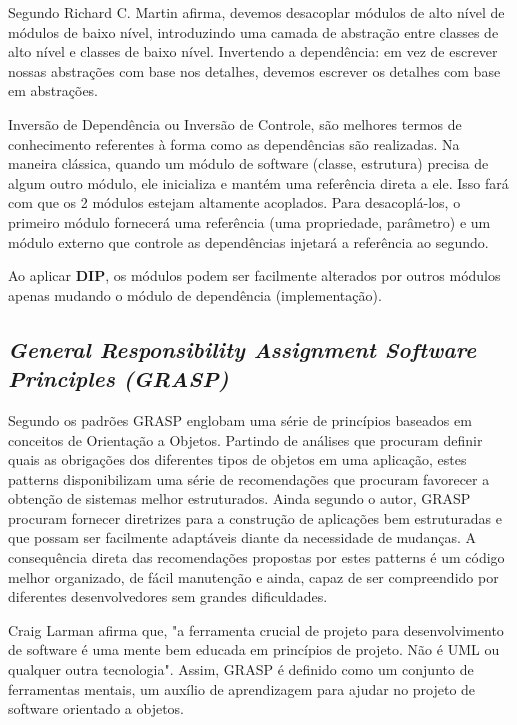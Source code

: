 \documentclass[12pt]{article}
\begin{document}
Segundo Richard C. Martin \cite{ROBERT_MARTIN_THE_CLEAN_ARCHITECTURE} afirma, devemos desacoplar módulos de alto nível de módulos de baixo nível, introduzindo uma camada de abstração entre classes de alto nível e classes de baixo nível. Invertendo a dependência: em vez de escrever nossas abstrações com base nos detalhes, devemos escrever os detalhes com base em abstrações.

Inversão de Dependência ou Inversão de Controle, são melhores termos de conhecimento referentes à forma como as dependências são realizadas. Na maneira clássica, quando um módulo de software (classe, estrutura) precisa de algum outro módulo, ele inicializa e mantém uma referência direta a ele. Isso fará com que os 2 módulos estejam altamente acoplados. Para desacoplá-los, o primeiro módulo fornecerá uma referência (uma propriedade, parâmetro) e um módulo externo que controle as dependências injetará a referência ao segundo.

Ao aplicar \textbf{DIP}, os módulos podem ser facilmente alterados por outros módulos apenas mudando o módulo de dependência (implementação).

\subsection{\textit{General Responsibility Assignment Software Principles (GRASP)}} \label{sec:grasp}

Segundo \cite{CRAIG_LARMAN} os padrões GRASP englobam uma série de princípios baseados em conceitos de Orientação a Objetos. Partindo de análises que procuram definir quais as obrigações dos diferentes tipos de objetos em uma aplicação, estes patterns disponibilizam uma série de recomendações que procuram favorecer a obtenção de sistemas melhor estruturados.
Ainda segundo o autor, GRASP procuram fornecer diretrizes para a construção de aplicações bem estruturadas e que possam ser facilmente adaptáveis diante da necessidade de mudanças. A consequência direta das recomendações propostas por estes patterns é um código melhor organizado, de fácil manutenção e ainda, capaz de ser compreendido por diferentes desenvolvedores sem grandes dificuldades.

Craig Larman afirma que, "a ferramenta crucial de projeto para desenvolvimento de software é uma mente bem educada em princípios de projeto. Não é UML ou qualquer outra tecnologia". \cite{CRAIG_LARMAN} Assim, GRASP é definido como um conjunto de ferramentas mentais, um auxílio de aprendizagem para ajudar no projeto de software orientado a objetos.
\end{document}
